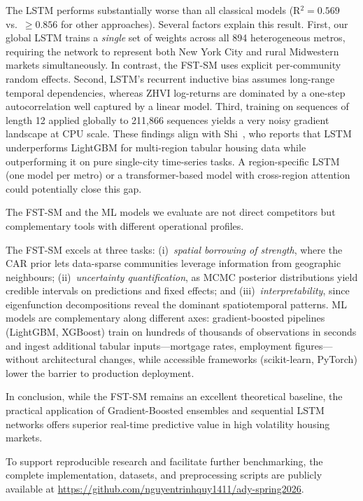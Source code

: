 \documentclass[runningheads]{llncs}
\begin{document}
The LSTM performs substantially worse than all classical models
(R$^2 = 0.569$ vs.\ $\geq 0.856$ for other approaches).
Several factors explain this result.
First, our global LSTM trains a \emph{single} set of weights across
all 894 heterogeneous metros, requiring the network to represent
both New York City and rural Midwestern markets simultaneously.
In contrast, the FST-SM uses explicit per-community random effects.
Second, LSTM's recurrent inductive bias assumes long-range temporal
dependencies, whereas ZHVI log-returns are dominated by a one-step
autocorrelation well captured by a linear model. Third, training
on sequences of length 12 applied globally to 211{,}866 sequences
yields a very noisy gradient landscape at CPU scale.
These findings align with Shi~\cite{ref_shi2023}, who reports that
LSTM underperforms LightGBM for multi-region tabular housing data
while outperforming it on pure single-city time-series tasks.
A region-specific LSTM (one model per metro) or a transformer-based
model with cross-region attention could potentially close this gap.

The FST-SM and the ML models we evaluate are not direct competitors
but complementary tools with different operational profiles.

The FST-SM excels at three tasks: (i)~\emph{spatial borrowing of strength}, where the CAR prior lets data-sparse communities leverage information from geographic neighbours; (ii)~\emph{uncertainty quantification}, as MCMC posterior distributions yield credible intervals on predictions and fixed effects; and (iii)~\emph{interpretability}, since eigenfunction decompositions reveal the dominant spatiotemporal patterns. ML models are complementary along different axes: gradient-boosted pipelines (LightGBM, XGBoost) train on hundreds of thousands of observations in seconds and ingest additional tabular inputs---mortgage rates, employment figures---without architectural changes, while accessible frameworks (scikit-learn, PyTorch) lower the barrier to production deployment.

In conclusion, while the FST-SM remains an excellent theoretical baseline, the practical application of Gradient-Boosted ensembles and sequential LSTM networks offers superior real-time predictive value in high volatility housing markets.

To support reproducible research and facilitate further benchmarking, the complete implementation, datasets, and preprocessing scripts are publicly available at \url{https://github.com/nguyentrinhquy1411/ady-spring2026}.
\end{document}
